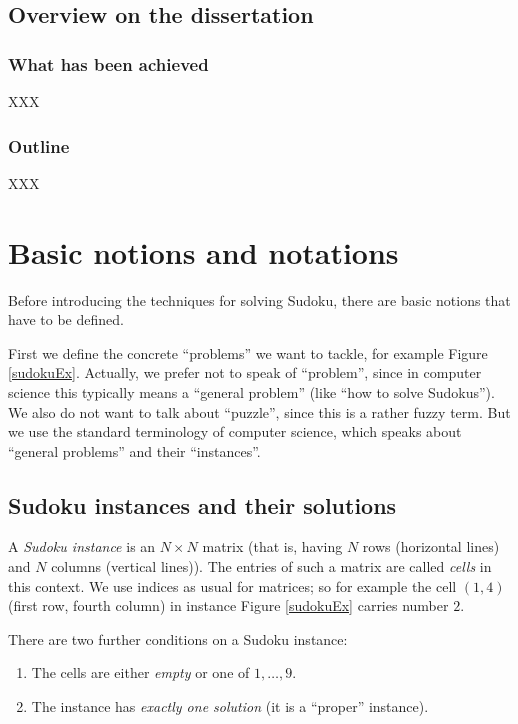 \documentclass[11pt]{report}
\begin{document}
\section{Overview on the dissertation}
\label{sec:overview}


\subsection{What has been achieved}
\label{sec:whatachieved}

XXX



\subsection{Outline}
\label{sec:OUtline}

XXX




\chapter{Basic notions and notations}
\label{cha:basicnotnotat}

Before introducing the techniques for solving Sudoku, there are basic notions that have to be defined.

First we define the concrete ``problems'' we want to tackle, for example Figure \ref{sudokuEx}. Actually, we prefer not to speak of ``problem'', since in computer science this typically means a ``general problem'' (like ``how to solve Sudokus''). We also do not want to talk about ``puzzle'', since this is a rather fuzzy term. But we use the standard terminology of computer science, which speaks about ``general problems'' and their ``instances''.


\section{Sudoku instances and their solutions}
\label{sec:Sudokuinstances}

A \textit{Sudoku instance} is an $N \times N$ matrix (that is, having $N$ rows (horizontal lines) and $N$ columns (vertical lines)). The entries of such a matrix are called \textit{cells} in this context. We use indices as usual for matrices; so for example the cell $(1,4)$ (first row, fourth column) in instance Figure \ref{sudokuEx} carries number $2$.

There are two further conditions on a Sudoku instance:
\begin{enumerate}
\item The cells are either \emph{empty} or one of $1, \dots, 9$.
\item The instance has \emph{exactly one solution} (it is a ``proper'' instance).
\end{enumerate}
\end{document}
